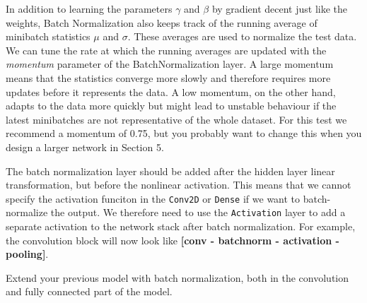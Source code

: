 \documentclass[11pt]{article}
\begin{document}
In addition to learning the parameters \(\gamma\) and \(\beta\) by
gradient decent just like the weights, Batch Normalization also keeps
track of the running average of minibatch statistics \(\mu\) and
\(\sigma\). These averages are used to normalize the test data. We can
tune the rate at which the running averages are updated with the
\emph{momentum} parameter of the BatchNormalization layer. A large
momentum means that the statistics converge more slowly and therefore
requires more updates before it represents the data. A low momentum, on
the other hand, adapts to the data more quickly but might lead to
unstable behaviour if the latest minibatches are not representative of
the whole dataset. For this test we recommend a momentum of 0.75, but
you probably want to change this when you design a larger network in
Section 5.

The batch normalization layer should be added after the hidden layer
linear transformation, but before the nonlinear activation. This means
that we cannot specify the activation funciton in the \texttt{Conv2D} or
\texttt{Dense} if we want to batch-normalize the output. We therefore
need to use the \texttt{Activation} layer to add a separate activation
to the network stack after batch normalization. For example, the
convolution block will now look like \textbf{{[}conv - batchnorm -
activation - pooling{]}}.

Extend your previous model with batch normalization, both in the
convolution and fully connected part of the model.
\end{document}
